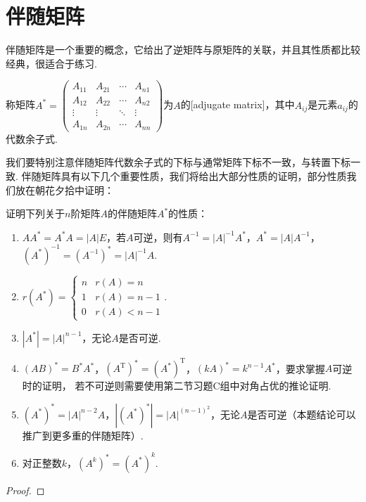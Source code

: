 \section{伴随矩阵}
伴随矩阵是一个重要的概念，它给出了逆矩阵与原矩阵的关联，并且其性质都比较经典，很适合于练习.
\begin{definition}
    称矩阵$A^*=\begin{pmatrix}
        A_{11} & A_{21} & \cdots & A_{n1} \\
        A_{12} & A_{22} & \cdots & A_{n2} \\
        \vdots & \vdots & \ddots & \vdots \\
        A_{1n} & A_{2n} & \cdots & A_{nn}
    \end{pmatrix}$为$A$的[adjugate matrix]，其中$A_{ij}$是元素$a_{ij}$的代数余子式.
\end{definition}
我们要特别注意伴随矩阵代数余子式的下标与通常矩阵下标不一致，与转置下标一致.
伴随矩阵具有以下几个重要性质，我们将给出大部分性质的证明，部分性质我们放在朝花夕拾中证明：
\begin{example} \label{ex:11:伴随矩阵}
    证明下列关于$n$阶矩阵$A$的伴随矩阵$A^*$的性质：
    \begin{enumerate}
        \item $AA^*=A^*A=|A|E$，若$A$可逆，则有$A^{-1}=|A|^{-1}A^*$，$A^*=|A|A^{-1}$，$(A^*)^{-1}=(A^{-1})^*=|A|^{-1}A$.

        \item $r(A^*)=\begin{cases}
        n & r(A)=n \\ 1 & r(A)=n-1 \\ 0 & r(A) < n-1
    \end{cases}$.

        \item $|A^*|=|A|^{n-1}$，无论$A$是否可逆.

        \item $(AB)^*=B^*A^*$，$(A^\mathrm{T})^*=(A^*)^\mathrm{T}$，$(kA)^*=k^{n-1}A^*$，要求掌握$A$可逆时的证明，
        若不可逆则需要使用第二节习题C组中对角占优的推论证明.

        \item $(A^*)^*=|A|^{n-2}A$，$|(A^*)^*|=|A|^{(n-1)^2}$，无论$A$是否可逆（本题结论可以推广到更多重的伴随矩阵）.

        \item 对正整数$k$，$(A^k)^*=(A^*)^k$.
    \end{enumerate}
\end{example}
\begin{proof}
    
\end{proof}

